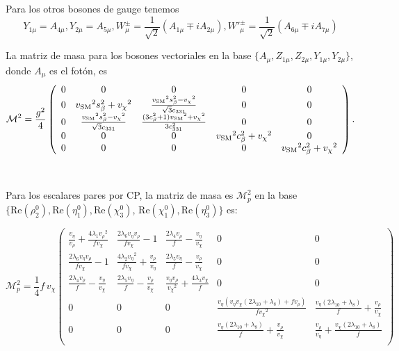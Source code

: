 Para los otros bosones de gauge tenemos
\begin{equation}
Y_{1\mu} = A_{4\mu}, Y_{2\mu} = A_{5\mu}, W_\mu^\pm = \frac{1}{\sqrt{2}} \left(  A_{1\mu} \mp iA_{2\mu} \right), W'^\pm_\mu = \frac{1}{\sqrt{2}} \left(  A_{6\mu} \mp iA_{7\mu} \right)  
\end{equation}

La matriz de masa para los bosones vectoriales en la base $\{A_\mu,Z_{1\mu},Z_{2\mu},Y_{1\mu},Y_{2\mu}\}$, donde $A_\mu$ es el fotón, es
\begin{equation}
\mathcal{M}^2 = \frac{g^2}{4}
\left(
\begin{array}{ccccc}
 0 & 0 & 0 & 0 & 0 \\
 0 & {v_{\rm SM}}^2 s_{\beta }^2+{v_\chi }^2 & \frac{{v_{\rm SM}}^2 s_{\beta }^2-{v_\chi }^2}{\sqrt{3} c_{331}} & 0 & 0 \\
 0 & \frac{{v_{\rm SM}}^2 s_{\beta }^2-{v_\chi }^2}{\sqrt{3} c_{331}} & \frac{(3 c_{\beta }^2+1){v_{\rm SM}}^2+{v_\chi }^2}{3 c_{331}^2} & 0 & 0 \\
 0 & 0 & 0 & {v_{\rm SM}}^2 c_{\beta }^2+{v_\chi }^2 & 0 \\
 0 & 0 & 0 & 0 & {v_{\rm SM}}^2 c_{\beta }^2+{v_\chi }^2 \\
\end{array}
\right).
\end{equation}

\  \ 

Para los escalares pares por CP, la matriz de masa es $\mathcal{M}_{p}^2$ en la base $\{ \text{Re} (\rho_2^0), \text{Re} (\eta_1^0), \text{Re} (\chi_3^0)$, $ \text{Re} (\chi_1^0), \text{Re} (\eta_3^0) \}$ es:
\begin{small}
\begin{equation}
\mathcal{M}_{p}^2 =\frac{1}{4}f\,  v_\chi
\left(
\begin{array}{ccccc}
 \frac{{v_\eta }}{{v_\rho }}+\frac{4 {\lambda_ 1} {v_\rho }^2}{{f} {v_\chi }} & \frac{2 {\lambda_ 6} {v_\eta } {v_\rho }}{{f} {v_\chi }}-1 & \frac{2 {\lambda_ 4} {v_\rho }}{{f}}-\frac{{v_\eta }}{{v_\chi }} & 0 & 0 \\
 \frac{2 {\lambda_ 6} {v_\eta } {v_\rho }}{{f} {v_\chi }}-1 & \frac{4 {\lambda_ 2} {v_\eta }^2}{{f} {v_\chi }}+\frac{{v_\rho }}{{v_\eta }} & \frac{2 {\lambda_ 5} {v_\eta }}{{f}}-\frac{{v_\rho }}{{v_\chi }} & 0 & 0 \\
 \frac{2 {\lambda_ 4} {v_\rho }}{{f}}-\frac{{v_\eta }}{{v_\chi }} & \frac{2 {\lambda_ 5} {v_\eta }}{{f}}-\frac{{v_\rho }}{{v_\chi }} & \frac{{v_\eta } {v_\rho }}{{v_\chi }^2}+\frac{4 {\lambda_ 3} {v_\chi }}{{f}} & 0 & 0 \\
 0 & 0 & 0 & \frac{{v_\eta } ({v_\eta } {v_\chi } (2 {\lambda_ {10}}+{\lambda_ 8})+{f} {v_\rho })}{{f} {v_\chi }^2} & \frac{{v_\eta } (2 {\lambda_ {10}}+{\lambda_ 8})}{{f}}+\frac{{v_\rho }}{{v_\chi }} \\
 0 & 0 & 0 & \frac{{v_\eta } (2 {\lambda_ {10}}+{\lambda_ 8})}{{f}}+\frac{{v_\rho }}{{v_\chi }} & \frac{{v_\rho }}{{v_\eta }}+\frac{{v_\chi } (2 {\lambda_ {10}}+{\lambda_ 8})}{{f}} \\
\end{array}
\right)
\end{equation}
\end{small}

